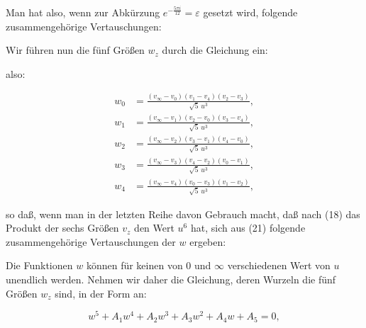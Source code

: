 
Man hat also, wenn zur Abkürzung $e^{-\frac{5\pi i}{12}} = \varepsilon$
gesetzt wird, folgende zusammengehörige Vertauschungen:


Wir führen nun die fünf Größen $w_z$ durch die Gleichung ein:


also:

\[
\begin{aligned}
w_0 &= \frac{(v_\infty - v_0)(v_1-v_4)(v_2-v_3)}{\sqrt{5}\,u^3},\\
w_1 &= \frac{(v_\infty - v_1)(v_2-v_0)(v_3-v_4)}{\sqrt{5}\,u^3},\\
w_2 &= \frac{(v_\infty - v_2)(v_3-v_1)(v_4-v_0)}{\sqrt{5}\,u^3},\\
w_3 &= \frac{(v_\infty - v_3)(v_4-v_2)(v_0-v_1)}{\sqrt{5}\,u^3},\\
w_4 &= \frac{(v_\infty - v_4)(v_0-v_3)(v_1-v_2)}{\sqrt{5}\,u^3},
\end{aligned}
\]

so daß, wenn man in der letzten Reihe davon Gebrauch macht, daß nach
(18) das Produkt der sechs Größen $v_z$ den Wert $u^6$ hat, sich aus
(21) folgende zusammengehörige Vertauschungen der $w$ ergeben:


Die Funktionen $w$ können für keinen von 0 und $\infty$ verschiedenen
Wert von $u$ unendlich werden. Nehmen wir daher die Gleichung, deren
Wurzeln die fünf Größen $w_z$ sind, in der Form an:

\[
w^5 + A_1w^4 + A_2w^3 + A_3w^2 + A_4w + A_5 = 0,
\]
